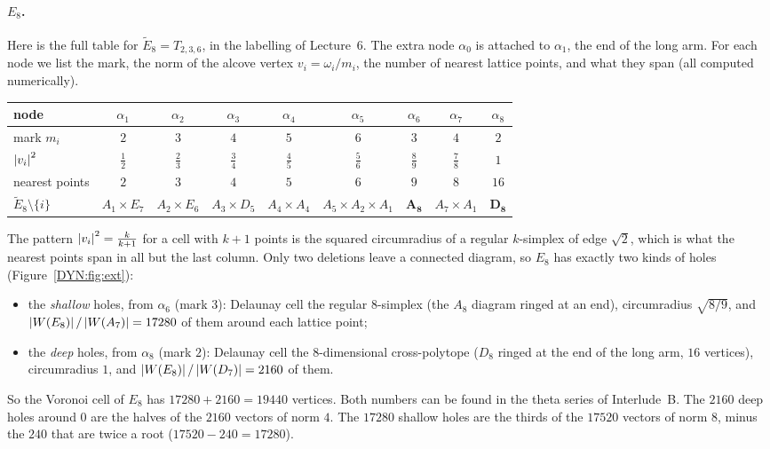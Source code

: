 \paragraph{$E_8$.} Here is the full table for $\tilde E_8=T_{2,3,6}$, in the labelling of Lecture~6. The
extra node $\alpha_0$ is attached to $\alpha_1$, the end of the long arm. For each node we list the mark,
the norm of the alcove vertex $v_i=\omega_i/m_i$, the number of nearest lattice points, and what they span
(all computed numerically).
\begin{center}
\renewcommand{\arraystretch}{1.15}
\small
\begin{tabular}{lcccccccc}
\toprule
node & $\alpha_1$ & $\alpha_2$ & $\alpha_3$ & $\alpha_4$ & $\alpha_5$ & $\alpha_6$ & $\alpha_7$ & $\alpha_8$\\
\midrule
mark $m_i$ & $2$ & $3$ & $4$ & $5$ & $6$ & $3$ & $4$ & $2$\\
$\left\lvert v_i \right\rvert^2$ & $\frac12$ & $\frac23$ & $\frac34$ & $\frac45$ & $\frac56$ & $\frac89$ & $\frac78$ & $1$\\
nearest points & $2$ & $3$ & $4$ & $5$ & $6$ & $9$ & $8$ & $16$\\
$\tilde E_8\setminus\{i\}$ & $A_1{\times}E_7$ & $A_2{\times}E_6$ & $A_3{\times}D_5$ & $A_4{\times}A_4$ & $A_5{\times}A_2{\times}A_1$ & $\mathbf{A_8}$ & $A_7{\times}A_1$ & $\mathbf{D_8}$\\
\bottomrule
\end{tabular}
\end{center}
The pattern $\left\lvert v_i \right\rvert^2=\frac k{k+1}$ for a cell with $k+1$ points is the squared circumradius of a
regular $k$-simplex of edge $\sqrt2$, which is what the nearest points span in all but the last column.
Only two deletions leave a connected diagram, so $E_8$ has exactly two kinds of holes (Figure~\ref{DYN:fig:ext}):
\begin{itemize}
\item the \emph{shallow} holes, from $\alpha_6$ (mark $3$): Delaunay cell the regular $8$-simplex (the $A_8$
  diagram ringed at an end), circumradius $\sqrt{8/9}$, and $\left\lvert W(E_8) \right\rvert/\left\lvert W(A_7) \right\rvert=17280$ of them around
  each lattice point;
\item the \emph{deep} holes, from $\alpha_8$ (mark $2$): Delaunay cell the $8$-dimensional cross-polytope
  ($D_8$ ringed at the end of the long arm, $16$ vertices), circumradius $1$, and
  $\left\lvert W(E_8) \right\rvert/\left\lvert W(D_7) \right\rvert=2160$ of them.
\end{itemize}
So the Voronoi cell of $E_8$ has $17280+2160=19440$ vertices. Both numbers can be found in the theta series
of Interlude~B. The $2160$ deep holes around $0$ are the halves of the $2160$ vectors of norm $4$. The
$17280$ shallow holes are the thirds of the $17520$ vectors of norm $8$, minus the $240$ that are twice a
root ($17520-240=17280$).

